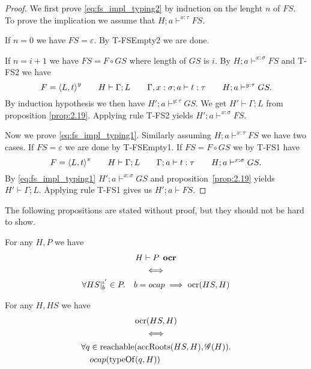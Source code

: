 \begin{proof}
  We first prove \eqref{eq:fs_impl_typing2} by induction on the lenght $n$ of
  $FS$. To prove the implication we assume that $H; a \vdash^{x: \tau} FS$.
  
  If $n = 0$ we have $FS = \varepsilon$. By {\sc T-FSEmpty2} we are done.
  
  If $n = i + 1$ we have $FS = F \circ GS$ where length of $GS$ is $i$. By  
  $H; a \vdash^{x: \sigma} FS$ and {\sc T-FS2} we have 
  \begin{equation*}
    F = \mbox{$\langle L, t \rangle$}^{y} \quad\quad H \vdash \Gamma; L \quad\quad \mbox{$\Gamma, x:
    \sigma;a\vdash t:\tau$} \quad\quad H; a \vdash^{y: \tau} GS.
  \end{equation*}
  By induction hypothesis we then have $H'; a \vdash^{y: \tau} GS$. We get $H'
  \vdash \Gamma; L$ from proposition \ref{prop:2.19}. Applying rule {\sc T-FS2}
  yields $H'; a \vdash^{x: \sigma} FS$.

  Now we prove \eqref{eq:fs_impl_typing1}. Similarly assuming $H; a \vdash^{x:
  \tau} FS$ we have two cases. If $FS = \varepsilon$ we are done by {\sc
  T-FSEmpty1}. If $FS = F \circ GS$ we by {\sc T-FS1} have
  \begin{equation*}
    F = \mbox{$\langle L, t \rangle$}^{x} \quad\quad H \vdash \Gamma; L \quad\quad
    \mbox{$\Gamma;a\vdash t:\tau$} \quad\quad H; a \vdash^{x: \sigma} GS.
  \end{equation*}
  By \eqref{eq:fs_impl_typing1} $H'; a \vdash^{x: \sigma} GS$ and
  proposition~\ref{prop:2.19} yields $H' \vdash \Gamma; L$. Applying rule {\sc
  T-FS1} gives us $H'; a \vdash FS$.
\end{proof}

The following propositions are stated without proof, but they should not be hard
to show.
\begin{proposition} \label{prop:ocr_eq}
  For any $H, P$ we have
  \begin{equation*}
    \begin{gathered}
      H \vdash P \:\: \mbox{\bf ocr} \\
      \iff \\
      \forall HS|_b^{\iota'} \in P. \quad
         b = \mbox{$ocap$} \implies \mbox{$\mathrm{ocr}$}(HS, H)
    \end{gathered}
  \end{equation*}
\end{proposition}

\begin{proposition} \label{prop:ocrloc_eq}
  For any $H, HS$ we have
  \begin{equation*}
    \begin{gathered}
      \mbox{$\mathrm{ocr}$}(HS, H) \\
      \iff  \\
      \begin{aligned}
        \forall q &\in \mbox{$\mathrm{reachable}$}(\mbox{$\mathrm{accRoots}$}(HS, H), \mathscr{G}(H)). \\
        & \mbox{$ocap$}(\mbox{$\mathrm{typeOf}$}(q, H))
      \end{aligned}
    \end{gathered}
  \end{equation*}
\end{proposition}

